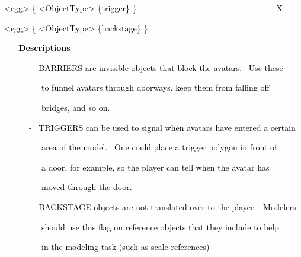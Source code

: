 \documentclass[a4paper]{article}
\newcommand\textstyleOOoComputerKeyWord[1]{\textrm{\textcolor[rgb]{0.0,0.0,0.5019608}{#1}}}
\begin{document}
\bigskip

{\color{black}
\textstyleOOoComputerKeyWord{\textcolor{black}{{\textless}egg{\textgreater} \{ {\textless}ObjectType{\textgreater}
\{trigger\} \} \ \ \ \ \ \ \ \ \ \ \ \ \ \ \ \ \ \ \ \ \ \ \ \ \ \ \ \ \ \ \ \ \ X}}}


\bigskip

{\color{black}
\textstyleOOoComputerKeyWord{\textcolor{black}{{\textless}egg{\textgreater} \{ {\textless}ObjectType{\textgreater}
\{backstage\} \}}}}


\bigskip

\clearpage
\bigskip

{\bfseries
\hypertarget{RefHeading7918869075401}{}\textstyleOOoComputerKeyWord{\textcolor{black}{\ \ \ Descriptions}}}


\bigskip

{\color{black}
\textstyleOOoComputerKeyWord{\textcolor{black}{\ \ \ \ \ \ {}- \ BARRIERS are invisible objects that block the avatars.
\ Use these}}}

{\color{black}
\textstyleOOoComputerKeyWord{\textcolor{black}{\ \ \ \ \ \ \ \ \ to funnel avatars through doorways, keep them from
falling off}}}

{\color{black}
\textstyleOOoComputerKeyWord{\textcolor{black}{\ \ \ \ \ \ \ \ \ bridges, and so on.}}}

{\color{black}
\textstyleOOoComputerKeyWord{\textcolor{black}{\ \ \ \ \ \ {}- \ TRIGGERS can be used to signal when avatars have
entered a certain}}}

{\color{black}
\textstyleOOoComputerKeyWord{\textcolor{black}{\ \ \ \ \ \ \ \ \ area of the model. \ One could place a trigger polygon
in front of}}}

{\color{black}
\textstyleOOoComputerKeyWord{\textcolor{black}{\ \ \ \ \ \ \ \ \ a door, for example, so the player can tell when the
avatar has}}}

{\color{black}
\textstyleOOoComputerKeyWord{\textcolor{black}{\ \ \ \ \ \ \ \ \ moved through the door.}}}

{\color{black}
\textstyleOOoComputerKeyWord{\textcolor{black}{\ \ \ \ \ \ {}- \ BACKSTAGE objects are not translated over to the
player. \ Modelers}}}

{\color{black}
\textstyleOOoComputerKeyWord{\textcolor{black}{\ \ \ \ \ \ \ \ \ should use this flag on reference objects that they
include to help }}}

{\color{black}
\textstyleOOoComputerKeyWord{\textcolor{black}{\ \ \ \ \ \ \ \ \ in the modeling task (such as scale references)}}}
\end{document}
